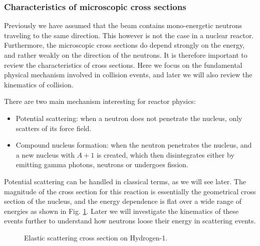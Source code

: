 \subsubsection{Characteristics of microscopic cross sections}

Previously we have assumed that the beam contains mono-energetic neutrons traveling to the same direction. This however is not the case in a nuclear reactor. Furthermore, the microscopic cross sections do depend strongly on the energy, and rather weakly on the direction of the neutrons. It is therefore important to review the characteristics of cross sections. Here we focus on the fundamental physical mechanism involved in collision events, and later we will also review the kinematics of collision.

There are two main mechanism interesting for reactor physics:

\begin{itemize}
\item Potential scattering: when a neutron does not penetrate the nucleus, only scatters of its force field.
\item Compound nucleus formation: when the neutron penetrates the nucleus, and a new nucleus with $A+1$ is created, which then disintegrates either by emitting gamma photons, neutrons or undergoes fission.
\end{itemize}

Potential scattering can be handled in classical terms, as we will see later. The magnitude of the cross section for this reaction is essentially the geometrical cross section of the nucleus, and the energy dependence is flat over a wide range of energies as shown in Fig. \ref{fig:h1scatter}. Later we will investigate the kinematics of these events further to understand how neutrons loose their energy in scattering events.

\begin{figure}[ht!]
\protect {}\protect
\caption{\label{fig:h1scatter} \footnotesize{Elastic scattering cross section on Hydrogen-1.}}
\end{figure}

